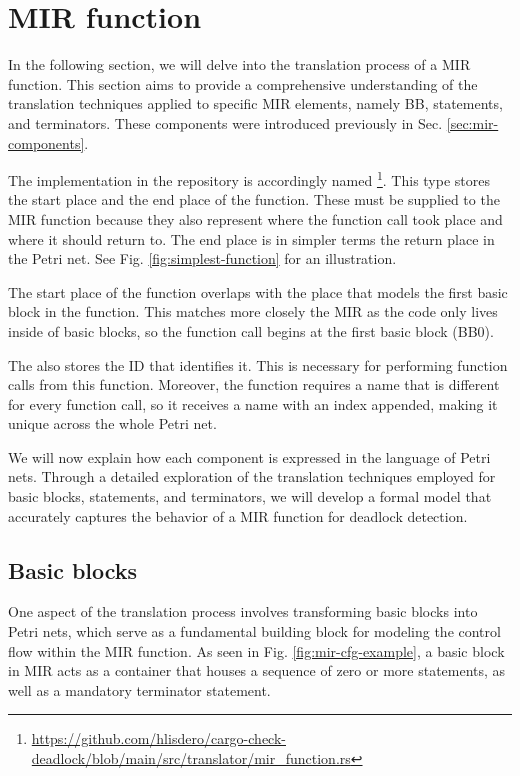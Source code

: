 \section{MIR function}

In the following section,
we will delve into the translation process of a \acrshort{MIR} function.
This section aims to provide a comprehensive understanding
of the translation techniques applied to specific \acrshort{MIR} elements,
namely \acrfull{BB}, statements, and terminators.
These components were introduced previously in Sec. \ref{sec:mir-components}.

The implementation in the repository is accordingly named
\footnote{\url{https://github.com/hlisdero/cargo-check-deadlock/blob/main/src/translator/mir_function.rs}}.
This type stores the start place and the end place of the function.
These must be supplied to the \acrshort{MIR} function because
they also represent where the function call took place and where it should return to.
The end place is in simpler terms the return place in the Petri net.
See Fig. \ref{fig:simplest-function} for an illustration.

The start place of the function overlaps with the place
that models the first basic block in the function.
This matches more closely the \acrshort{MIR} as the code only lives inside of basic blocks,
so the function call begins at the first basic block (BB0).

The  also stores the ID that identifies it.
This is necessary for performing function calls from this function.
Moreover, the function requires a name that is different for every function call,
so it receives a name with an index appended, making it unique across the whole Petri net.

We will now explain how each component is expressed in the language of Petri nets.
Through a detailed exploration of the translation techniques employed for
basic blocks, statements, and terminators, we will develop a formal model that
accurately captures the behavior of a \acrshort{MIR} function for deadlock detection.

\subsection{Basic blocks}

One aspect of the translation process involves transforming basic blocks into Petri nets,
which serve as a fundamental building block for modeling the control flow within the \acrshort{MIR} function.
As seen in Fig. \ref{fig:mir-cfg-example}, a basic block in \acrshort{MIR} acts as a container
that houses a sequence of zero or more statements, as well as a mandatory terminator statement.

